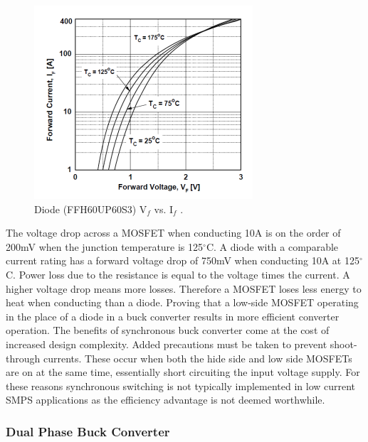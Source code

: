 \documentclass[11pt]{article}
\begin{document}
    \begin{figure}[H]
            \centering
            \includegraphics[width=0.5\linewidth]{diode.PNG}
            \caption{Diode (FFH60UP60S3) V$_f$ vs. I$_f$ \cite{on_semiconductor_ffh60up60s_2018}.}
            \label{diode}
        \end{figure}
    
    \noindent The voltage drop across a MOSFET when conducting 10A is on the order of 200mV when the junction temperature is 125$^{\circ}$C. A diode with a comparable current rating has a forward voltage drop of 750mV when conducting 10A at 125$^{\circ}$C. Power loss due to the resistance is equal to the voltage times the current. A higher voltage drop means more losses. Therefore a MOSFET loses less energy to heat when conducting than a diode. Proving that a low-side MOSFET operating in the place of a diode in a buck converter results in more efficient converter operation. 
    \newline
    \newline
    The benefits of synchronous buck converter come at the cost of increased design complexity. Added precautions must be taken to prevent shoot-through currents. These occur when both the hide side and low side MOSFETs are on at the same time, essentially short circuiting the input voltage supply. For these reasons synchronous switching is not typically implemented in low current SMPS applications as the efficiency advantage is not deemed worthwhile.
    
    \subsubsection{Dual Phase Buck Converter}
    
\end{document}
